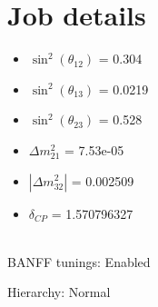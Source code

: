 \documentclass[10pt,a4paper]{article}
\begin{document}
\section*{Job details}


\begin{minipage}[t]{0.5\textwidth}
\begin{itemize}
\item[] $\sin^2(\theta_{12})$ = 0.304
\item[] $\sin^2(\theta_{13})$ = 0.0219
\item[] $\sin^2(\theta_{23})$ = 0.528
\item[] $\Delta m^2_{21}$ = 7.53e-05
\item[] $|\Delta m^2_{32}|$ = 0.002509
\item[] $\delta_{CP}$ = 1.570796327
\end{itemize}
\end{minipage}
\\



BANFF tunings: Enabled

Hierarchy: Normal
\end{document}
